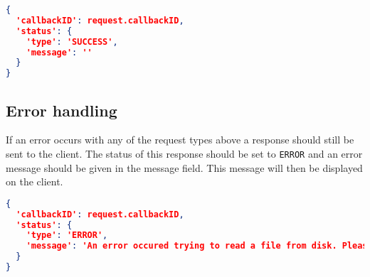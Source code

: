 \documentclass[A4,12pt, utf8]{article}
\begin{document}
\begin{lstlisting}[caption=response content, language=json]
{
  'callbackID': request.callbackID,
  'status': {
    'type': 'SUCCESS',
    'message': ''
  }
}
\end{lstlisting}



\subsection{Error handling}

If an error occurs with any of the request types above a response should still be sent to the client. The status of this response should be set to \texttt{ERROR} and an error message should be given in the message field. This message will then be displayed on the client.

\begin{lstlisting}[caption=ERROR response content, language=json]
{
  'callbackID': request.callbackID,
  'status': {
    'type': 'ERROR',
    'message': 'An error occured trying to read a file from disk. Please make sure: /path/to/file exists or check the config...
  }
}
\end{lstlisting}
\end{document}
